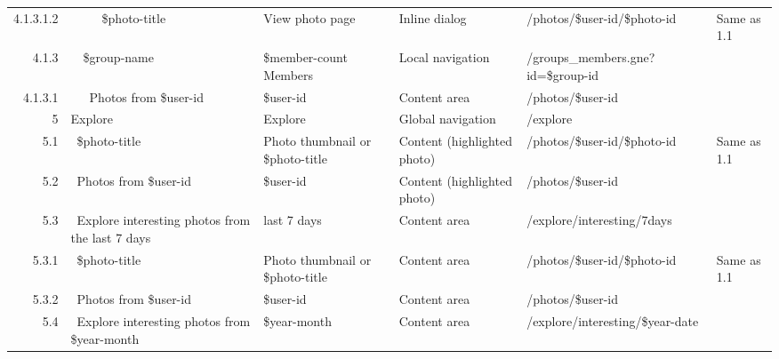 \documentclass[12pt,a4paper]{article}
\begin{document}
\begin{landscape}
\begin{table}[h!b!p!]
\begin{center}
\begin{tiny}
\begin{tabular}{r|l|l|l|l|p{3cm}}
                    4.1.3.1.2 &
                    ~~~~~\$photo-title &
                    View photo page &
                    Inline dialog &
                    /photos/\$user-id/\$photo-id &
                    Same as 1.1 \\

                4.1.3 &
                ~~\$group-name  &
                \$member-count Members &
                Local navigation &
                /groups\_members.gne?id=\$group-id &
                \\

                  4.1.3.1 &
                  ~~~Photos from \$user-id &
                  \$user-id &
                  Content area &
                  /photos/\$user-id &
                  \\


            5 &
            Explore &
            Explore &
            Global navigation &
            /explore &
            \\

              5.1 &
              ~\$photo-title &
              Photo thumbnail or \$photo-title &
              Content (highlighted photo) &
              /photos/\$user-id/\$photo-id &
              Same as 1.1 \\

              5.2 &
              ~Photos from \$user-id &
              \$user-id &
              Content (highlighted photo) &
              /photos/\$user-id &
              \\

              5.3 &
              ~Explore interesting photos from the last 7 days &
              last 7 days &
              Content area &
              /explore/interesting/7days &
              \\

                5.3.1 &
                ~\$photo-title &
                Photo thumbnail or \$photo-title &
                Content area &
                /photos/\$user-id/\$photo-id &
                Same as 1.1 \\

                5.3.2 &
                ~Photos from \$user-id &
                \$user-id &
                Content area &
                /photos/\$user-id &
                \\

              5.4 &
              ~Explore interesting photos from \$year-month &
              \$year-month &
              Content area &
              /explore/interesting/\$year-date &
              \\


\end{tabular}
\end{tiny}
\end{center}
\end{table}
\end{landscape}
\end{document}
